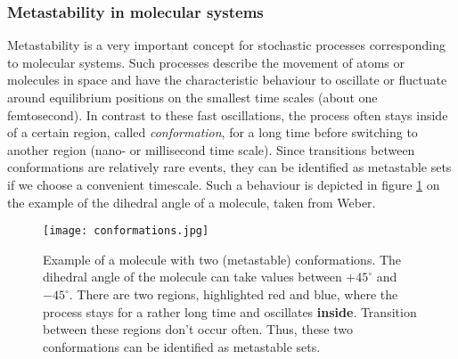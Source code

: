\subsubsection*{Metastability in molecular systems}

Metastability is a very important concept for stochastic processes corresponding to molecular systems. Such processes describe the movement of atoms or molecules in space and
have the characteristic behaviour to oscillate or fluctuate around equilibrium positions on the smallest time scales (about one femtosecond). 
In contrast to these fast oscillations, the process often stays inside of a certain region, called \textit{conformation}, for a long time before switching to another region (nano- or millisecond time scale).
Since transitions between conformations are relatively rare events, they can be identified as metastable sets if we choose a convenient timescale.
Such a behaviour is depicted in figure \ref{fig:conformations} on the example of the dihedral angle of a molecule, taken from Weber\cite{weber2011subspace}.


\begin{figure}[!htb]
	\label{fig:conformations}
	\centering
	\texttt{[image: conformations.jpg]} %
	\caption{Example of a molecule with two (metastable) conformations. The dihedral angle of the molecule can take values between $+45^\circ$ and $-45^\circ$. There are two regions, highlighted red and blue, where the process stays for a rather long time and oscillates \textbf{inside}. Transition between these regions don't occur often. Thus, these two conformations can be identified as metastable sets.}
\end{figure}



